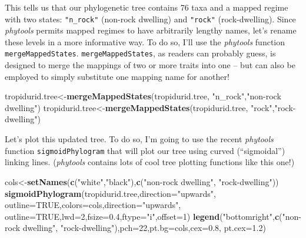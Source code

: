 \documentclass[fleqn,10pt,lineno]{wlpeerj} %
\newenvironment{Shaded}{\begin{snugshade}}{\end{snugshade}}
\newcommand{\AttributeTok}[1]{\textcolor[rgb]{0.13,0.29,0.53}{#1}}
\newcommand{\ConstantTok}[1]{\textcolor[rgb]{0.56,0.35,0.01}{#1}}
\newcommand{\DecValTok}[1]{\textcolor[rgb]{0.00,0.00,0.81}{#1}}
\newcommand{\FloatTok}[1]{\textcolor[rgb]{0.00,0.00,0.81}{#1}}
\newcommand{\FunctionTok}[1]{\textcolor[rgb]{0.13,0.29,0.53}{\textbf{#1}}}
\newcommand{\NormalTok}[1]{#1}
\newcommand{\OtherTok}[1]{\textcolor[rgb]{0.56,0.35,0.01}{#1}}
\newcommand{\StringTok}[1]{\textcolor[rgb]{0.31,0.60,0.02}{#1}}
\begin{document}
This tells us that our phylogenetic tree contains 76 taxa and a mapped regime with two states: \texttt{"n\_rock"} (non-rock dwelling) and \texttt{"rock"} (rock-dwelling). Since \emph{phytools} permits mapped regimes to have arbitrarily lengthy names, let's rename these levels in a more informative way. To do so, I'll use the \emph{phytools} function \texttt{mergeMappedStates}. \texttt{mergeMappedStates}, as readers can probably guess, is designed to merge the mappings of two or more traits into one -- but can also be employed to simply substitute one mapping name for another!

\begin{Shaded}
\begin{Highlighting}[]
\NormalTok{tropidurid.tree}\OtherTok{\textless{}{-}}\FunctionTok{mergeMappedStates}\NormalTok{(tropidurid.tree,}
  \StringTok{"n\_rock"}\NormalTok{,}\StringTok{"non{-}rock dwelling"}\NormalTok{)}
\NormalTok{tropidurid.tree}\OtherTok{\textless{}{-}}\FunctionTok{mergeMappedStates}\NormalTok{(tropidurid.tree,}
  \StringTok{"rock"}\NormalTok{,}\StringTok{"rock{-}dwelling"}\NormalTok{)}
\end{Highlighting}
\end{Shaded}

Let's plot this updated tree. To do so, I'm going to use the recent \emph{phytools} function \texttt{sigmoidPhylogram} that will plot our tree using curved (``sigmoidal'') linking lines. (\emph{phytools} contains lots of cool tree plotting functions like this one!)

\begin{Shaded}
\begin{Highlighting}[]
\NormalTok{cols}\OtherTok{\textless{}{-}}\FunctionTok{setNames}\NormalTok{(}\FunctionTok{c}\NormalTok{(}\StringTok{"white"}\NormalTok{,}\StringTok{"black"}\NormalTok{),}\FunctionTok{c}\NormalTok{(}\StringTok{"non{-}rock dwelling"}\NormalTok{,}
  \StringTok{"rock{-}dwelling"}\NormalTok{))}
\FunctionTok{sigmoidPhylogram}\NormalTok{(tropidurid.tree,}\AttributeTok{direction=}\StringTok{"upwards"}\NormalTok{,}
  \AttributeTok{outline=}\ConstantTok{TRUE}\NormalTok{,}\AttributeTok{colors=}\NormalTok{cols,}\AttributeTok{direction=}\StringTok{"upwards"}\NormalTok{,}
  \AttributeTok{outline=}\ConstantTok{TRUE}\NormalTok{,}\AttributeTok{lwd=}\DecValTok{2}\NormalTok{,}\AttributeTok{fsize=}\FloatTok{0.4}\NormalTok{,}\AttributeTok{ftype=}\StringTok{"i"}\NormalTok{,}\AttributeTok{offset=}\DecValTok{1}\NormalTok{)}
\FunctionTok{legend}\NormalTok{(}\StringTok{"bottomright"}\NormalTok{,}\FunctionTok{c}\NormalTok{(}\StringTok{"non{-}rock dwelling"}\NormalTok{,}
  \StringTok{"rock{-}dwelling"}\NormalTok{),}\AttributeTok{pch=}\DecValTok{22}\NormalTok{,}\AttributeTok{pt.bg=}\NormalTok{cols,}\AttributeTok{cex=}\FloatTok{0.8}\NormalTok{,}
  \AttributeTok{pt.cex=}\FloatTok{1.2}\NormalTok{)}
\end{Highlighting}
\end{Shaded}
\end{document}
